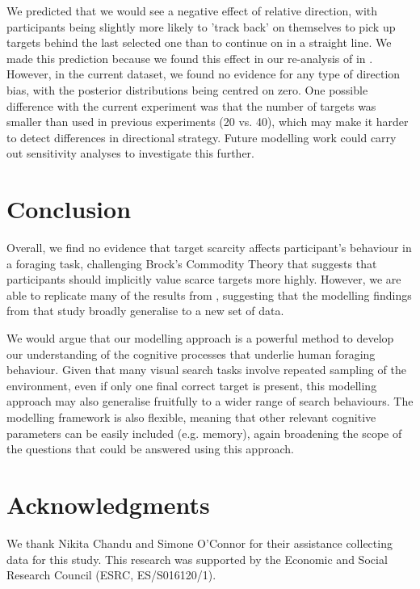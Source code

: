 \documentclass[12pt]{article}
\begin{document}
We predicted that we would see a negative effect of relative direction, with participants being slightly more likely to 'track back' on themselves to pick up targets behind the last selected one than to continue on in a straight line. We made this prediction because we found this effect in our re-analysis of \citep{clarke2022stable} in \cite{clarke2022foraging}. However, in the current dataset, we found no evidence for any type of direction bias, with the posterior distributions being centred on zero. One possible difference with the current experiment was that the number of targets was smaller than used in previous experiments (20 vs. 40), which may make it harder to detect differences in directional strategy. Future modelling work could carry out sensitivity analyses to investigate this further.

\section{Conclusion}

Overall, we find no evidence that target scarcity affects participant's behaviour in a foraging task, challenging Brock's Commodity Theory \citep{brock1968implications} that suggests that participants should implicitly value scarce targets more highly. However, we are able to replicate many of the results from \citep{clarke2022foraging}, suggesting that the modelling findings from that study broadly generalise to a new set of data.

We would argue that our modelling approach is a powerful method to develop our understanding of the cognitive processes that underlie human foraging behaviour. Given that many visual search tasks involve repeated sampling of the environment, even if only one final correct target is present, this modelling approach may also generalise fruitfully to a wider range of search behaviours. The modelling framework is also flexible, meaning that other relevant cognitive parameters can be easily included (e.g. memory), again broadening the scope of the questions that could be answered using this approach.


\raggedright
\section*{Acknowledgments}

We thank Nikita Chandu and Simone O'Connor for their assistance collecting data for this study. This research was supported by the Economic and Social Research Council (ESRC, ES/S016120/1). 



\end{document}
